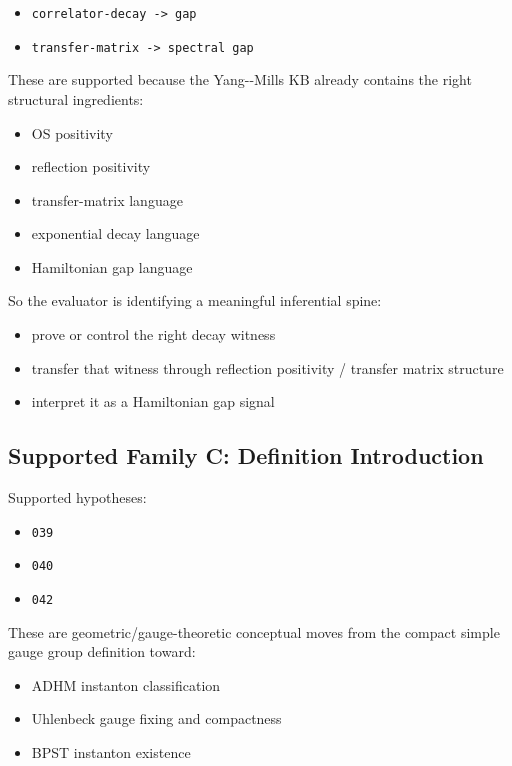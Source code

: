 \documentclass[
]{article}
\providecommand{\tightlist}{%
  \setlength{\itemsep}{0pt}\setlength{\parskip}{0pt}}
\begin{document}
\begin{itemize}
\tightlist
\item
  \texttt{correlator-decay\ -\textgreater{}\ gap}
\item
  \texttt{transfer-matrix\ -\textgreater{}\ spectral\ gap}
\end{itemize}

These are supported because the Yang-\/-Mills KB already contains the
right structural ingredients:

\begin{itemize}
\tightlist
\item
  OS positivity
\item
  reflection positivity
\item
  transfer-matrix language
\item
  exponential decay language
\item
  Hamiltonian gap language
\end{itemize}

So the evaluator is identifying a meaningful inferential spine:

\begin{itemize}
\tightlist
\item
  prove or control the right decay witness
\item
  transfer that witness through reflection positivity / transfer matrix
  structure
\item
  interpret it as a Hamiltonian gap signal
\end{itemize}

\subsection{Supported Family C: Definition
Introduction}\label{supported-family-c-definition-introduction}

Supported hypotheses:

\begin{itemize}
\tightlist
\item
  \texttt{039}
\item
  \texttt{040}
\item
  \texttt{042}
\end{itemize}

These are geometric/gauge-theoretic conceptual moves from the compact
simple gauge group definition toward:

\begin{itemize}
\tightlist
\item
  ADHM instanton classification
\item
  Uhlenbeck gauge fixing and compactness
\item
  BPST instanton existence
\end{itemize}
\end{document}
